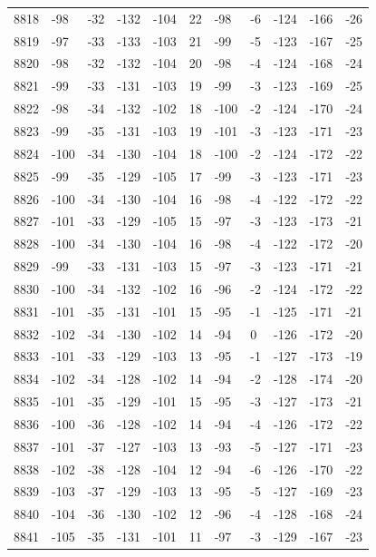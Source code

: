 \begin{table}[H]
\begin{tabular}{lllllllllll}
8818 & -98 & -32 & -132 & -104 & 22 & -98 & -6 & -124 & -166 & -26 \\
8819 & -97 & -33 & -133 & -103 & 21 & -99 & -5 & -123 & -167 & -25 \\
8820 & -98 & -32 & -132 & -104 & 20 & -98 & -4 & -124 & -168 & -24 \\
8821 & -99 & -33 & -131 & -103 & 19 & -99 & -3 & -123 & -169 & -25 \\
8822 & -98 & -34 & -132 & -102 & 18 & -100 & -2 & -124 & -170 & -24 \\
8823 & -99 & -35 & -131 & -103 & 19 & -101 & -3 & -123 & -171 & -23 \\
8824 & -100 & -34 & -130 & -104 & 18 & -100 & -2 & -124 & -172 & -22 \\
8825 & -99 & -35 & -129 & -105 & 17 & -99 & -3 & -123 & -171 & -23 \\
8826 & -100 & -34 & -130 & -104 & 16 & -98 & -4 & -122 & -172 & -22 \\
8827 & -101 & -33 & -129 & -105 & 15 & -97 & -3 & -123 & -173 & -21 \\
8828 & -100 & -34 & -130 & -104 & 16 & -98 & -4 & -122 & -172 & -20 \\
8829 & -99 & -33 & -131 & -103 & 15 & -97 & -3 & -123 & -171 & -21 \\
8830 & -100 & -34 & -132 & -102 & 16 & -96 & -2 & -124 & -172 & -22 \\
8831 & -101 & -35 & -131 & -101 & 15 & -95 & -1 & -125 & -171 & -21 \\
8832 & -102 & -34 & -130 & -102 & 14 & -94 & 0 & -126 & -172 & -20 \\
8833 & -101 & -33 & -129 & -103 & 13 & -95 & -1 & -127 & -173 & -19 \\
8834 & -102 & -34 & -128 & -102 & 14 & -94 & -2 & -128 & -174 & -20 \\
8835 & -101 & -35 & -129 & -101 & 15 & -95 & -3 & -127 & -173 & -21 \\
8836 & -100 & -36 & -128 & -102 & 14 & -94 & -4 & -126 & -172 & -22 \\
8837 & -101 & -37 & -127 & -103 & 13 & -93 & -5 & -127 & -171 & -23 \\
8838 & -102 & -38 & -128 & -104 & 12 & -94 & -6 & -126 & -170 & -22 \\
8839 & -103 & -37 & -129 & -103 & 13 & -95 & -5 & -127 & -169 & -23 \\
8840 & -104 & -36 & -130 & -102 & 12 & -96 & -4 & -128 & -168 & -24 \\
8841 & -105 & -35 & -131 & -101 & 11 & -97 & -3 & -129 & -167 & -23 \\

\end{tabular}
\end{table}
